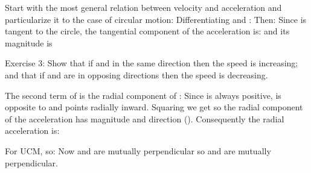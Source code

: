 {
Start with the most general relation between velocity and acceleration and
particularize it to the case of circular motion:
%
%
Differentiating  and :
%
%
Then:
%
%
Since \m{\uvec{\theta}} is tangent to the circle, the tangential component of
the acceleration is:
%
%
and its magnitude is
%
%
\begin{center}
\fbox%
{\parbox[t]{3.2in}%
 {Exercise 3:  Show that if  and  in the same direction
  then the speed is increasing; and that if  and  are in
  opposing directions then the speed is decreasing.
 }
}
\end{center}
The second term of  is the radial component of :
%
%
Since  is always positive,  is
opposite to  and points radially inward.
Squaring  we get  so the radial component of
the  acceleration has magnitude  and direction ().
Consequently the radial acceleration is:
%
%

For UCM,  so:
%
%
%
Now  and \m{\uvec{\theta}} are mutually perpendicular so 
and  are mutually perpendicular.
}%

